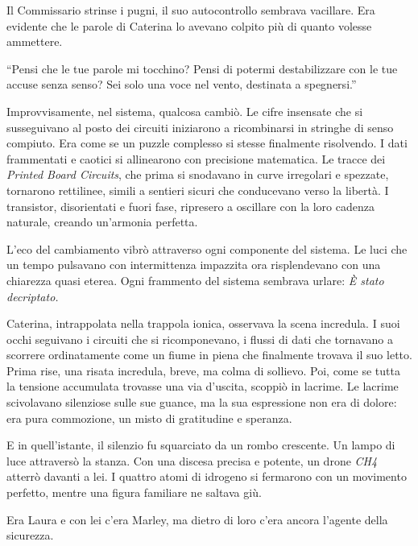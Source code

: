 Il Commissario strinse i pugni, il suo autocontrollo sembrava vacillare. Era evidente che le parole di Caterina lo avevano colpito più di quanto volesse ammettere.

\begin{dialogue}
 \enquote{Pensi che le tue parole mi tocchino? Pensi di potermi destabilizzare con le tue accuse senza senso? Sei solo una voce nel vento, destinata a spegnersi.}
\end{dialogue}


Improvvisamente, nel sistema, qualcosa cambiò. Le cifre insensate che si susseguivano al posto dei  circuiti iniziarono a ricombinarsi in stringhe di senso compiuto. Era come se un puzzle complesso si stesse finalmente risolvendo. I dati frammentati e caotici si allinearono con precisione matematica. Le tracce dei \textit{Printed Board Circuits}, che prima si snodavano in curve irregolari e spezzate, tornarono rettilinee, simili a sentieri sicuri che conducevano verso la libertà. I transistor, disorientati e fuori fase, ripresero a oscillare con la loro cadenza naturale, creando un'armonia perfetta.

L’eco del cambiamento vibrò attraverso ogni componente del sistema. Le luci che un tempo pulsavano con intermittenza impazzita ora risplendevano con una chiarezza quasi eterea. Ogni frammento del sistema sembrava urlare: \emph{È stato decriptato.}

Caterina, intrappolata nella trappola ionica, osservava la scena incredula. I suoi occhi seguivano i circuiti che si ricomponevano, i flussi di dati che tornavano a scorrere ordinatamente come un fiume in piena che finalmente trovava il suo letto. Prima rise, una risata incredula, breve, ma colma di sollievo. Poi, come se tutta la tensione accumulata trovasse una via d'uscita, scoppiò in lacrime. Le lacrime scivolavano silenziose sulle sue guance, ma la sua espressione non era di dolore: era pura commozione, un misto di gratitudine e speranza.

E in quell'istante, il silenzio fu squarciato da un rombo crescente. Un lampo di luce attraversò la stanza. Con una discesa precisa e potente, un drone \textit{CH4} atterrò davanti a lei. I quattro atomi di idrogeno si fermarono con un movimento perfetto, mentre una figura familiare ne saltava giù.

Era Laura e con lei c'era Marley, ma dietro di loro c'era ancora l'agente della sicurezza.


